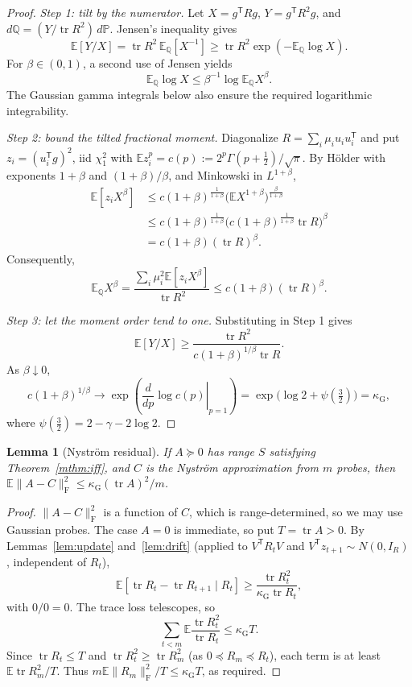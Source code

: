 \documentclass[11pt,a4paper]{article}
\newtheorem{lemma}[theorem]{Lemma}
\theoremstyle{definition}
\theoremstyle{remark}
\numberwithin{equation}{section}
\newcommand{\E}{\mathbb E}
\newcommand{\Prob}{\mathbb P}
\newcommand{\T}{{\mathsf T}}
\newcommand{\tr}{\operatorname{tr}}
\newcommand{\norm}[1]{\lVert#1\rVert}
\newcommand{\kapG}{\kappa_{\mathrm G}}
\newcommand{\F}{\mathrm F}
\begin{document}
\begin{proof}
\emph{Step 1: tilt by the numerator.}
Let $X=g^\T Rg$, $Y=g^\T R^2g$, and
$d\mathbb Q=(Y/\tr R^2)\,d\Prob$. Jensen's inequality gives
\[
 \E[Y/X]=\tr R^2\,\E_{\mathbb Q}[X^{-1}]
 \ge\tr R^2\exp(-\E_{\mathbb Q}\log X).
\]
For $\beta\in(0,1)$, a second use of Jensen yields
\[
 \E_{\mathbb Q}\log X\le\beta^{-1}\log\E_{\mathbb Q}X^\beta.
\]
The Gaussian gamma integrals below also ensure the required logarithmic
integrability.

\emph{Step 2: bound the tilted fractional moment.} Diagonalize
$R=\sum_i\mu_iu_iu_i^\T$ and put $z_i=(u_i^\T g)^2$, iid $\chi^2_1$ with
$\E z_i^p=c(p):=2^p\Gamma(p+\frac12)/\sqrt\pi$. By H\"older with exponents
$1+\beta$ and $(1+\beta)/\beta$, and Minkowski in $L^{1+\beta}$,
\[
 \begin{aligned}
 \E[z_iX^\beta]
 &\le c(1+\beta)^{\frac1{1+\beta}}
       \bigl(\E X^{1+\beta}\bigr)^{\frac\beta{1+\beta}}\\
 &\le c(1+\beta)^{\frac1{1+\beta}}
       \bigl(c(1+\beta)^{\frac1{1+\beta}}\tr R\bigr)^\beta\\
 &=c(1+\beta)(\tr R)^\beta .
 \end{aligned}
\]
Consequently,
\[
 \E_{\mathbb Q}X^\beta
 =\frac{\sum_i\mu_i^2\E[z_iX^\beta]}{\tr R^2}
 \le c(1+\beta)(\tr R)^\beta.
\]

\emph{Step 3: let the moment order tend to one.}
Substituting in Step 1 gives
\[
 \E[Y/X]\ge\frac{\tr R^2}{c(1+\beta)^{1/\beta}\tr R}.
\]
As $\beta\downarrow0$,
\[
 c(1+\beta)^{1/\beta}
 \longrightarrow\exp\!\left(\left.\frac{d}{dp}\log c(p)\right|_{p=1}\right)
 =\exp\bigl(\log2+\psi(\tfrac32)\bigr)=\kapG,
\]
where $\psi(\frac32)=2-\gamma-2\log2$.
\end{proof}

\begin{lemma}[Nystr\"om residual]\label{lem:residual}
If $A\succeq0$ has range $S$ satisfying Theorem~\ref{mthm:iff}, and $C$ is the
Nystr\"om approximation from $m$ probes, then
$\E\norm{A-C}_\F^2\le\kapG(\tr A)^2/m$.
\end{lemma}

\begin{proof}
$\norm{A-C}_\F^2$ is a function of $C$, which is range-determined, so we may
use Gaussian probes. The case $A=0$ is immediate, so put $T=\tr A>0$.
By Lemmas~\ref{lem:update}
and~\ref{lem:drift} (applied to $V^\T R_tV$ and $V^\T z_{t+1}\sim N(0,I_R)$,
independent of $R_t$),
\[
 \E[\tr R_t-\tr R_{t+1}\mid R_t]
 \ge\frac{\tr R_t^2}{\kapG\tr R_t},
\]
with $0/0=0$. The trace loss telescopes, so
\[
 \sum_{t<m}\E\frac{\tr R_t^2}{\tr R_t}\le\kapG T.
\]
Since
$\tr R_t\le T$ and $\tr R_t^2\ge\tr R_m^2$ (as $0\preceq R_m\preceq R_t$), each
term is at least $\E\tr R_m^2/T$. Thus
$m\E\norm{R_m}_\F^2/T\le\kapG T$, as required.
\end{proof}
\end{document}
